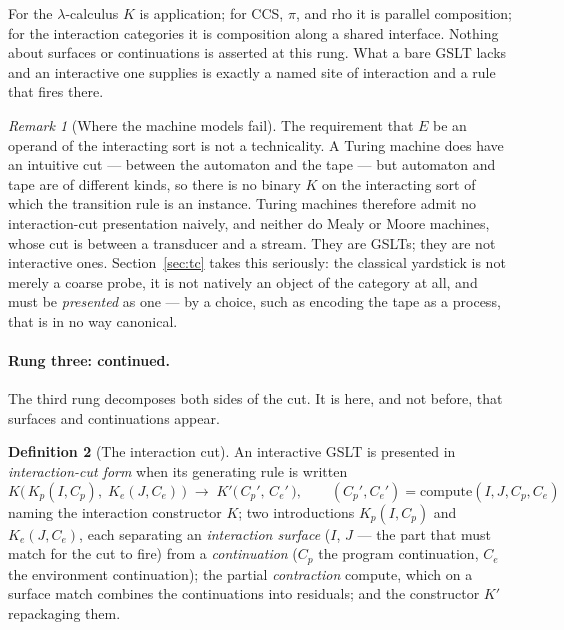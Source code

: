 \documentclass[11pt,a4paper]{article}
\theoremstyle{definition}
\newtheorem{definition}{Definition}[section]
\theoremstyle{plain}
\theoremstyle{remark}
\newtheorem{remark}[definition]{Remark}
\begin{document}
For the $\lambda$-calculus $K$ is application; for CCS, $\pi$, and rho it is parallel
composition; for the interaction categories it is composition along a shared
interface. Nothing about surfaces or continuations is asserted at this rung. What a
bare GSLT lacks and an interactive one supplies is exactly a named site of
interaction and a rule that fires there.

\begin{remark}[Where the machine models fail]
\label{rem:machines}
The requirement that $E$ be an operand of the interacting sort is not a
technicality. A Turing machine does have an intuitive cut --- between the automaton
and the tape --- but automaton and tape are of different kinds, so there is no binary
$K$ on the interacting sort of which the transition rule is an instance. Turing
machines therefore admit no interaction-cut presentation naively, and neither do
Mealy or Moore machines, whose cut is between a transducer and a stream. They are
GSLTs; they are not interactive ones. Section~\ref{sec:tc} takes this seriously: the
classical yardstick is not merely a coarse probe, it is not natively an object of the
category at all, and must be \emph{presented} as one --- by a choice, such as encoding
the tape as a process, that is in no way canonical.
\end{remark}

\paragraph{Rung three: continued.}

The third rung decomposes both sides of the cut. It is here, and not before, that
surfaces and continuations appear.

\begin{definition}[The interaction cut]
\label{def:cut}
An interactive GSLT is presented in \emph{interaction-cut form} when its generating
rule is written
\[
K\bigl(\,K_p(I,C_p),\; K_e(J,C_e)\,\bigr) \;\longrightarrow\; K'\bigl(\,C_p',\,C_e'\,\bigr),
\qquad
(C_p',C_e') = \mathrm{compute}(I,J,C_p,C_e)
\tag{$\dagger$}
\]
naming the interaction constructor $K$; two introductions $K_p(I,C_p)$ and
$K_e(J,C_e)$, each separating an \emph{interaction surface} ($I$, $J$ --- the part that
must match for the cut to fire) from a \emph{continuation} ($C_p$ the program
continuation, $C_e$ the environment continuation); the partial \emph{contraction}
$\mathrm{compute}$, which on a surface match combines the continuations into
residuals; and the constructor $K'$ repackaging them.
\end{definition}
\end{document}
